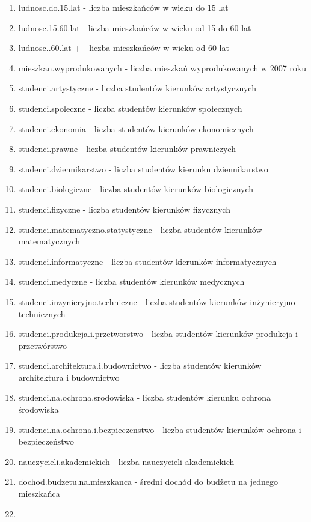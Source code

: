 \documentclass[polish,]{book}
\begin{document}
\begin{enumerate}
\def\labelenumi{\arabic{enumi}.}
\item
  ludnosc.do.15.lat - liczba mieszkańców w wieku do 15 lat
\item
  ludnosc.15.60.lat - liczba mieszkańców w wieku od 15 do 60 lat
\item
  ludnosc..60.lat + - liczba mieszkańców w wieku od 60 lat
\item
  mieszkan.wyprodukowanych - liczba mieszkań wyprodukowanych w 2007 roku
\item
  studenci.artystyczne - liczba studentów kierunków artystycznych
\item
  studenci.spoleczne - liczba studentów kierunków społecznych
\item
  studenci.ekonomia - liczba studentów kierunków ekonomicznych
\item
  studenci.prawne - liczba studentów kierunków prawniczych
\item
  studenci.dziennikarstwo - liczba studentów kierunku dziennikarstwo
\item
  studenci.biologiczne - liczba studentów kierunków biologicznych
\item
  studenci.fizyczne - liczba studentów kierunków fizycznych
\item
  studenci.matematyczno.statystyczne - liczba studentów kierunków matematycznych
\item
  studenci.informatyczne - liczba studentów kierunków informatycznych
\item
  studenci.medyczne - liczba studentów kierunków medycznych
\item
  studenci.inzynieryjno.techniczne - liczba studentów kierunków inżynieryjno technicznych
\item
  studenci.produkcja.i.przetworstwo - liczba studentów kierunków produkcja i
  przetwórstwo
\item
  studenci.architektura.i.budownictwo - liczba studentów kierunków architektura i budownictwo
\item
  studenci.na.ochrona.srodowiska - liczba studentów kierunku ochrona środowiska
\item
  studenci.na.ochrona.i.bezpieczenstwo - liczba studentów kierunków ochrona i
  bezpieczeństwo
\item
  nauczycieli.akademickich - liczba nauczycieli akademickich
\item
  dochod.budzetu.na.mieszkanca - średni dochód do budżetu na jednego mieszkańca
\item

\end{enumerate}
\end{document}
